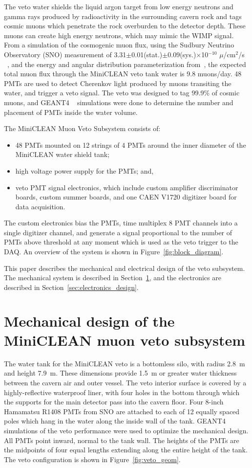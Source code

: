 \documentclass[review,number,sort&compress]{elsarticle}
\begin{document}
The veto water shields the liquid argon target from low energy neutrons and gamma
rays produced by radioactivity in the surrounding cavern rock and tags cosmic muons
which penetrate the rock overburden to the detector depth. These muons can
create high energy neutrons, which may mimic the WIMP signal.
From a simulation of the cosmogenic muon flux, using the Sudbury Neutrino Observatory (SNO) measurement of
3.31$\pm$0.01(stat.)$\pm$0.09(sys.)$\times$10$^{-10}$ $\mu$/cm$^2$/s
~\cite{ref:sno_muon_flux}, and the energy and angular distribution
parameterization from~\cite{ref:mei_and_hime}, the expected total muon flux
through the MiniCLEAN veto tank water is 9.8 muons/day. 48 PMTs are used to
detect Cherenkov light produced by muons transiting the water, and trigger a
veto signal. The veto was designed to tag 99.9\% of cosmic muons, and GEANT4
~\cite{ref:geant4} simulations were done to determine the number and placement
of PMTs inside the water volume. 

The MiniCLEAN Muon Veto Subsystem consists of:
\begin{itemize}
\item 48 PMTs mounted on 12 strings of 4 PMTs around the inner diameter of the MiniCLEAN water shield tank;
\item high voltage power supply for the PMTs; and,
\item veto PMT signal electronics, which include custom amplifier discriminator boards, custom summer boards, and one CAEN V1720 digitizer board for data acquisition. 
\end{itemize}
The custom electronics bias the PMTs, time multiplex 8 PMT channels into a
single digitizer channel, and generate a signal proportional to the number
of PMTs above threshold at any moment which is used as the veto trigger to
the DAQ. An overview of the system is shown in
Figure~\ref{fig:block_diagram}.

This paper describes the mechanical and electrical design of the veto
subsystem. The mechanical system is described in
Section~\ref{sec:subsystem_design}, and the electronics are
described in Section~\ref{sec:electronics_design}.


\section{Mechanical design of the MiniCLEAN muon veto subsystem}
\label{sec:subsystem_design}
%
The water tank for the MiniCLEAN veto is a bottomless silo, with
radius 2.8~m and height 7.9~m. These dimensions provide 1.5~m or
greater water thickness between the cavern air and outer vessel. The
veto interior surface is covered by a highly-reflective waterproof liner, with four
holes in the bottom through which the supports for the main detector
pass into the cavern floor. Four 8-inch Hamamatsu R1408 PMTs from SNO are
attached to each of 12 equally spaced poles which hang in the water
along the inside wall of the tank. GEANT4~\cite{ref:geant4} simulations
of the veto performance were used to optimize the mechanical
design. All PMTs point inward, normal to the tank wall. The heights
of the PMTs are the midpoints of four equal lengths extending along
the entire height of the tank. The veto configuration is shown in
Figure~\ref{fig:veto_geom}. 
\end{document}
